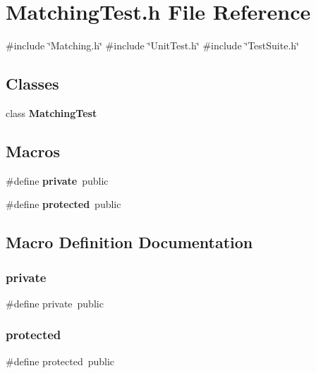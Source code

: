 \section{Matching\+Test.\+h File Reference}
\label{MatchingTest_8h}
{\ttfamily \#include \char`\"{}Matching.\+h\char`\"{}}\newline
{\ttfamily \#include \char`\"{}Unit\+Test.\+h\char`\"{}}\newline
{\ttfamily \#include \char`\"{}Test\+Suite.\+h\char`\"{}}\newline
\subsection*{Classes}
\begin{DoxyCompactItemize}
\item 
class \textbf{ Matching\+Test}
\end{DoxyCompactItemize}
\subsection*{Macros}
\begin{DoxyCompactItemize}
\item 
\#define \textbf{ private}~public
\item 
\#define \textbf{ protected}~public
\end{DoxyCompactItemize}


\subsection{Macro Definition Documentation}
\mbox{\label{MatchingTest_8h_a6a1d6e1a12975a4e9a0b5b952e79eaad}} 
\subsubsection{private}
{\footnotesize\ttfamily \#define private~public}

\mbox{\label{MatchingTest_8h_a363c8dcebb1777654ad1703136a14ec8}} 
\subsubsection{protected}
{\footnotesize\ttfamily \#define protected~public}

